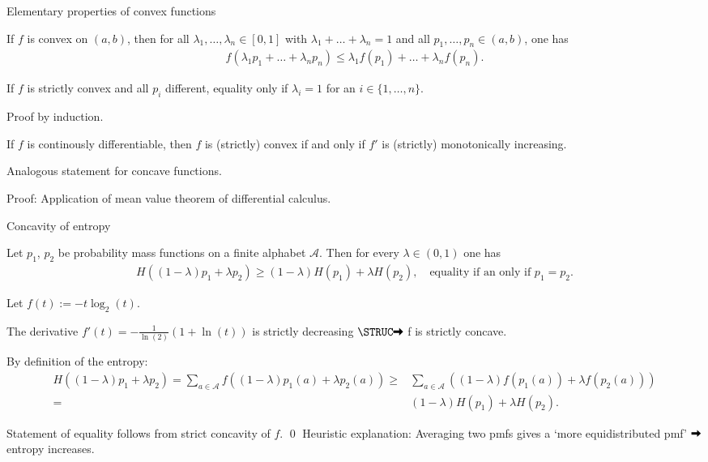 \begin{frame}{Elementary properties of convex functions}
\bit
\item If $f$ is convex on $(a,b)$, then for all $\lambda_1,\dots,\lambda_n\in[0,1]$ with $\lambda_1+\dots+\lambda_n=1$ and all 
$p_1,\dots,p_n\in (a,b)$, one has
\begin{align*}
f(\lambda_1 p_1+\dots+\lambda_np_n)\leq \lambda_1f(p_1)+\dots+\lambda_nf(p_n). 
\end{align*}
\item If $f$ is strictly convex and all $p_i$ different, equality only if $\lambda_i=1$ for an $i\in\{1,\dots,n\}$. 
\item Proof by induction.
\eit
{}
\bit
\item If $f$ is continously differentiable, then $f$ is (strictly) convex if and only if $f'$ is (strictly) monotonically increasing. 
\item Analogous statement for concave functions.  
\item Proof: Application of  mean value theorem of differential calculus.
\eit


\end{frame}

\begin{frame}{Concavity of entropy}
\begin{proposition}
Let $p_1$, $p_2$ be probability mass functions on a finite alphabet $\mathcal{A}$. 
Then for every $\lambda\in(0,1)$ one has 
\begin{align*}
H((1-\lambda)p_1+\lambda p_2)\geq (1-\lambda)H(p_1)+\lambda H(p_2), \quad \text{equality if an only if $p_1=p_2$}. 
\end{align*}
\end{proposition}
\vspace{-2.9mm}
{} 
\bit 
\item Let $f(t):=-t\log_2(t)$. 
\item The derivative $f'(t)=-\frac{1}{\ln(2)}(1+\ln(t))$ is strictly decreasing $\loud\iarrow$ f is strictly concave. 
\item[\iarrow] By definition of the entropy:
\begin{align*}
H((1-\lambda)p_1+\lambda p_2)=\sum_{a\in\mathcal{A}}f((1-\lambda)p_1(a)+\lambda p_2(a))
\geq & \sum_{a\in\mathcal{A}}\left((1-\lambda)f(p_1(a))+\lambda f(p_2(a))\right)\\
=&(1-\lambda)H(p_1)+\lambda H(p_2).
\end{align*} 
 \item Statement of equality follows from strict concavity of $f$.  \qed
\eit
Heuristic explanation: Averaging two pmfs gives a `more equidistributed pmf' $\iarrow$ entropy increases. 
\end{frame}




